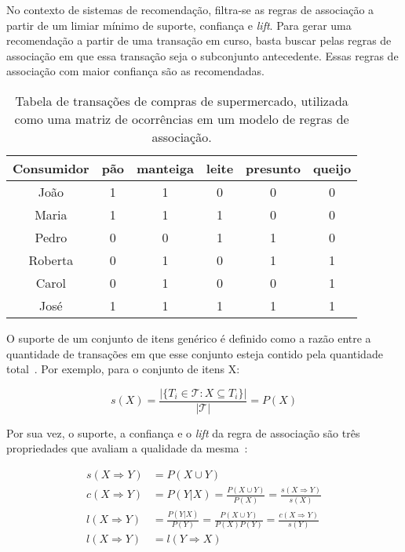 No contexto de sistemas de recomendação, filtra-se as regras de associação a partir
de um limiar mínimo de suporte, confiança e \textit{lift}. Para gerar uma recomendação
a partir de uma transação em curso, basta buscar pelas regras de associação em
que essa transação seja o subconjunto antecedente. Essas regras de associação com maior
confiança são as recomendadas.

\begin{table}
\begin{center}
    \begin{tabular}{|c|c|c|c|c|c|}
        \hline
        \textbf{Consumidor} & pão & manteiga & leite & presunto & queijo \\
        \hline
        João & 1 & 1 & 0 & 0 & 0 \\
        Maria & 1 & 1 & 1 & 0 & 0 \\
        Pedro & 0 & 0 & 1 & 1 & 0 \\
        Roberta & 0 & 1 & 0 & 1 & 1 \\
        Carol & 0 & 1 & 0 & 0 & 1 \\
        José & 1 & 1 & 1 & 1 & 1 \\
        \hline
    \end{tabular}
    \label{tab:transactions}
\end{center}
\caption{Tabela de transações de compras de supermercado, utilizada como uma matriz de ocorrências em um modelo de regras de associação.}
\end{table}


O suporte de um conjunto de itens genérico é definido como a razão entre a
quantidade de transações em que esse conjunto esteja contido pela quantidade
total~\cite{larose2014discovering}. Por exemplo, para o conjunto de itens X:

\begin{equation}
s(X) = \frac{|\{T_i \in \mathcal{T} : X \subseteq T_i\}|}{|\mathcal{T}|} = P(X)
\end{equation}

Por sua vez, o suporte, a confiança e o \textit{lift} da regra de associação são três
propriedades que avaliam a qualidade da mesma~\cite{larose2014discovering}:

\begin{align}
    s(X \Rightarrow Y) &= P( X \cup Y ) \\
    c(X \Rightarrow Y) &= P(Y|X) = \frac{P(X \cup Y)}{P(X)} = \frac{s(X \Rightarrow Y)}{s(X)}  \\
    l(X \Rightarrow Y) &= \frac{P(Y|X)}{P(Y)} = \frac{P(X \cup Y)}{P(X)P(Y)} = \frac{c(X \Rightarrow Y)}{s(Y)}\\
    l(X \Rightarrow Y) &= l(Y \Rightarrow X) 
\end{align}


